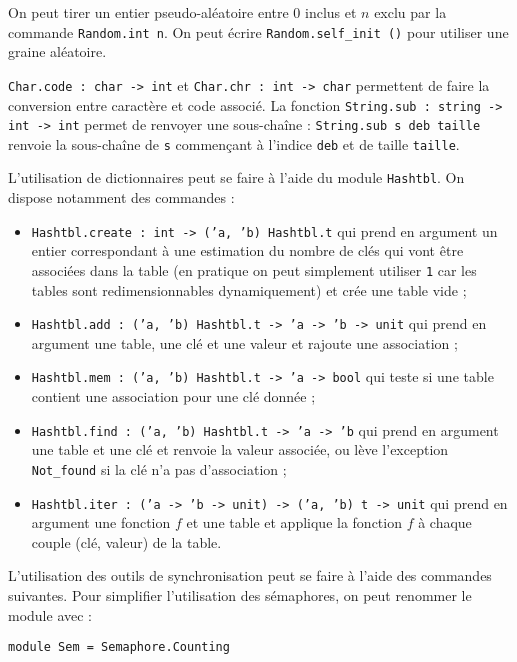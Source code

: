 \documentclass[10pt]{article}
\begin{document}
On peut tirer un entier pseudo-aléatoire entre $0$ inclus et $n$ exclu par la commande \verb"Random.int n". On peut écrire \verb"Random.self_init ()" pour utiliser une graine aléatoire.

\verb"Char.code : char -> int" et \verb"Char.chr : int -> char" permettent de faire la conversion entre caractère et code associé. La fonction \verb"String.sub : string -> int -> int" permet de renvoyer une sous-chaîne : \verb"String.sub s deb taille" renvoie la sous-chaîne de \verb"s" commençant à l'indice \verb"deb" et de taille \verb"taille".

L'utilisation de dictionnaires peut se faire à l'aide du module \verb"Hashtbl". On dispose notamment des commandes : 

\begin{itemize}
\item \texttt{Hashtbl.create : int -> ('a, 'b) Hashtbl.t} qui prend en argument un entier correspondant à une estimation du nombre de clés qui vont être associées dans la table (en pratique on peut simplement utiliser \verb"1" car les tables sont redimensionnables dynamiquement) et crée une table vide ;
\item \texttt{Hashtbl.add : ('a, 'b) Hashtbl.t -> 'a -> 'b -> unit} qui prend en argument une table, une clé et une valeur et rajoute une association ;
\item \texttt{Hashtbl.mem : ('a, 'b) Hashtbl.t -> 'a -> bool} qui teste si une table contient une association pour une clé donnée ;
\item \texttt{Hashtbl.find : ('a, 'b) Hashtbl.t -> 'a -> 'b} qui prend en argument une table et une clé et renvoie la valeur associée, ou lève l'exception \verb"Not_found" si la clé n'a pas d'association ;
\item \texttt{Hashtbl.iter : ('a -> 'b -> unit) -> ('a, 'b) t -> unit} qui prend en argument une fonction $f$ et une table et applique la fonction $f$ à chaque couple (clé, valeur) de la table.
\end{itemize}

L'utilisation des outils de synchronisation peut se faire à l'aide des commandes suivantes. Pour simplifier l'utilisation des sémaphores, on peut renommer le module avec :
\begin{cbox}
   \begin{verbatim}
module Sem = Semaphore.Counting
   \end{verbatim}
\end{cbox}
\end{document}
